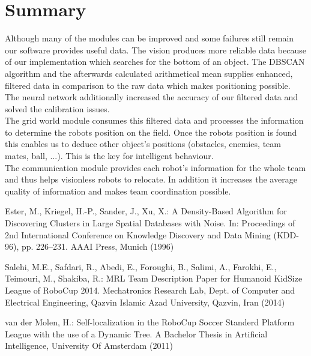 \documentclass[lnicst,a4paper]{svmultln}
\begin{document}

\section{Summary}
Although many of the modules can be improved and some failures still remain our software provides useful data. The vision produces more reliable data because of our implementation which searches for the bottom of an object. The DBSCAN algorithm and the afterwards calculated arithmetical mean supplies enhanced, filtered data in comparison to the raw data which makes positioning possible. The neural network additionally increased the accuracy of our filtered data and solved the calibration issues.
\\
The grid world module consumes this filtered data and processes the information to determine the robots position on the field. Once the robots position is found this enables us to deduce other object's positions (obstacles, enemies, team mates, ball, ...). This is the key for intelligent behaviour.
\\
The communication module provides each robot's information for the whole team and thus helps visionless robots to relocate. In addition it increases the average quality of information and makes team coordination possible.





\begin{thebibliography}{5}

 Ester, M., Kriegel, H.-P., Sander, J., Xu, X.:
A Density-Based Algorithm for Discovering Clusters in Large Spatial Databases with Noise.
In: Proceedings of 2nd International Conference on Knowledge Discovery and Data Mining (KDD-96),
pp. 226--231. AAAI Press, Munich (1996)

 Salehi, M.E., Safdari, R., Abedi, E., Foroughi, B., Salimi, A., Farokhi, E., Teimouri, M., Shakiba, R.: MRL Team Description Paper for Humanoid KidSize League of RoboCup 2014. 
Mechatronics Research Lab, Dept. of Computer and Electrical Engineering,
Qazvin Islamic Azad University, Qazvin, Iran (2014)

 van der Molen, H.: Self-localization in the RoboCup Soccer Standerd Platform League with the use of a Dynamic Tree. A Bachelor Thesis in Artificial Intelligence, University Of Amsterdam (2011)


\end{thebibliography}
\end{document}

